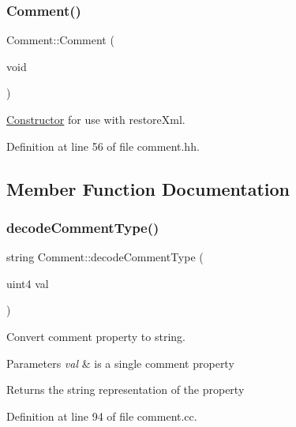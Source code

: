 \subsubsection{\texorpdfstring{Comment()}{Comment()}\hspace{0.1cm}{\footnotesize\ttfamily [2/2]}}
{\footnotesize\ttfamily Comment\+::\+Comment (\begin{DoxyParamCaption}\item[{void}]{ }\end{DoxyParamCaption})\hspace{0.3cm}{\ttfamily [inline]}}



\mbox{\hyperlink{class_constructor}{Constructor}} for use with restore\+Xml. 



Definition at line 56 of file comment.\+hh.



\subsection{Member Function Documentation}
\mbox{\label{class_comment_af30bb24a512fb5f9ed352be71a26ff2d}} 
\subsubsection{\texorpdfstring{decodeCommentType()}{decodeCommentType()}}
{\footnotesize\ttfamily string Comment\+::decode\+Comment\+Type (\begin{DoxyParamCaption}\item[{uint4}]{val }\end{DoxyParamCaption})\hspace{0.3cm}{\ttfamily [static]}}



Convert comment property to string. 


\begin{DoxyParams}{Parameters}
{\em val} & is a single comment property \\
\hline
\end{DoxyParams}
\begin{DoxyReturn}{Returns}
the string representation of the property 
\end{DoxyReturn}


Definition at line 94 of file comment.\+cc.

